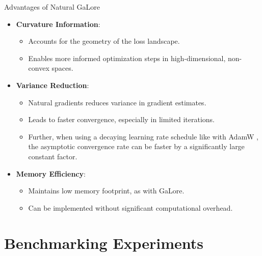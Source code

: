 \documentclass{beamer}
\begin{document}
\begin{frame}{Advantages of Natural GaLore}
    \begin{itemize}
        \item \textbf{Curvature Information}:
            \begin{itemize}
                \item Accounts for the geometry of the loss landscape.
                \item Enables more informed optimization steps in high-dimensional, non-convex spaces.
            \end{itemize}
        \item \textbf{Variance Reduction}:
            \begin{itemize}
                \item Natural gradients reduces variance in gradient estimates.
                \item Leads to faster convergence, especially in limited iterations.
                \item Further, when using a decaying learning rate schedule like with AdamW \citep{loshchilov2017decoupled}, the asymptotic convergence rate can be faster \citep{martens2020new} by a significantly large constant factor.
            \end{itemize}
        \item \textbf{Memory Efficiency}:
            \begin{itemize}
                \item Maintains low memory footprint, as with GaLore.
                \item Can be implemented without significant computational overhead.
            \end{itemize}
    \end{itemize}
\end{frame}

\section{Benchmarking Experiments}
\end{document}
